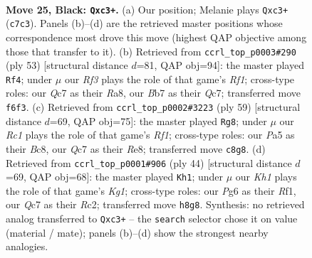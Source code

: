 \documentclass[11pt]{article}
\begin{document}
\clearpage

\begin{figure}[p]\centering
\begin{subfigure}{0.46\textwidth}\centering
\resizebox{\linewidth}{!}{%
\newchessgame
\chessboard[
  setfen={2r4k/1bqn1p1p/5rp1/pp1Pp3/4P3/1PP3P1/5P1P/R1Q1K1NR b - - 3 25},
  showmover=false,
  pgfstyle=straightmove, color=movearrow, markmove={c7-c3}
]}
\caption{}
\end{subfigure}\hfill
\begin{subfigure}{0.46\textwidth}\centering
\resizebox{\linewidth}{!}{%
\newchessgame
\chessboard[
  setfen={r4r1k/2qn3p/1pp1p3/3pP1pP/PP1P2N1/3R4/5P2/R1Q3K1 b - - 1 27},
  showmover=false,
  pgfstyle=straightmove, color=movearrow, markmove={f8-f4}
]}
\caption{}
\end{subfigure}
\\[4pt]
\begin{subfigure}{0.46\textwidth}\centering
\resizebox{\linewidth}{!}{%
\newchessgame
\chessboard[
  setfen={2b1rr1k/p1n3qp/1p3p2/3p4/P1pP3P/2P1P1P1/5RBK/2Q1R1N1 b - - 5 30},
  showmover=false,
  pgfstyle=straightmove, color=movearrow, markmove={f8-g8}
]}
\caption{}
\end{subfigure}\hfill
\begin{subfigure}{0.46\textwidth}\centering
\resizebox{\linewidth}{!}{%
\newchessgame
\chessboard[
  setfen={r1q3k1/6pp/1pp5/p2pP3/3P1r2/bP1Q4/P1R2P1P/4NRK1 w - - 0 23},
  showmover=false,
  pgfstyle=straightmove, color=movearrow, markmove={g1-h1}
]}
\caption{}
\end{subfigure}
\caption{\textbf{Move 25, Black: \texttt{Qxc3+}.} (a) Our position; Melanie plays \texttt{Qxc3+} (\texttt{c7c3}). Panels (b)--(d) are the retrieved master positions whose correspondence most drove this move (highest QAP objective among those that transfer to it). (b) Retrieved from \texttt{ccrl\_top\_p0003\#290} (ply 53) [structural distance $d$=81, QAP obj=94]: the master played \texttt{Rf4}; under $\mu$ our \emph{Rf3} plays the role of that game's \emph{Rf1}; cross-type roles: our \emph{Q}c7 as their \emph{R}a8, our \emph{B}b7 as their \emph{Q}c7; transferred move \texttt{f6f3}. (c) Retrieved from \texttt{ccrl\_top\_p0002\#3223} (ply 59) [structural distance $d$=69, QAP obj=75]: the master played \texttt{Rg8}; under $\mu$ our \emph{Rc1} plays the role of that game's \emph{Rf1}; cross-type roles: our \emph{P}a5 as their \emph{B}c8, our \emph{Q}c7 as their \emph{R}e8; transferred move \texttt{c8g8}. (d) Retrieved from \texttt{ccrl\_top\_p0001\#906} (ply 44) [structural distance $d$=69, QAP obj=68]: the master played \texttt{Kh1}; under $\mu$ our \emph{Kh1} plays the role of that game's \emph{Kg1}; cross-type roles: our \emph{P}g6 as their \emph{R}f1, our \emph{Q}c7 as their \emph{R}c2; transferred move \texttt{h8g8}. Synthesis: no retrieved analog transferred to \texttt{Qxc3+} -- the \texttt{search} selector chose it on value (material / mate); panels (b)--(d) show the strongest nearby analogies.}
\label{fig:thought-m49}
\end{figure}
\end{document}
